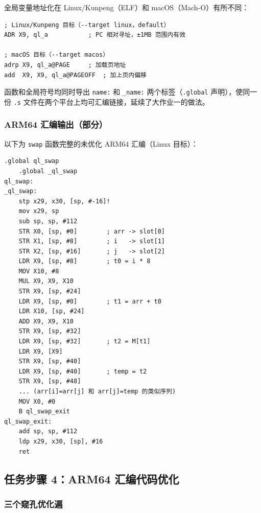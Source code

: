 \documentclass[12pt,a4paper]{ctexart}
\begin{document}
全局变量地址化在 Linux/Kunpeng（ELF）和 macOS（Mach-O）有所不同：

\begin{lstlisting}[language=ARM, caption={全局地址化：Linux 使用 ADR，macOS 使用 ADRP}]
; Linux/Kunpeng 目标（--target linux，default）
ADR X9, ql_a           ; PC 相对寻址，±1MB 范围内有效

; macOS 目标（--target macos）
adrp X9, ql_a@PAGE     ; 加载页地址
add  X9, X9, ql_a@PAGEOFF  ; 加上页内偏移
\end{lstlisting}

函数和全局符号均同时导出 \texttt{name:} 和 \texttt{\_name:} 两个标签（\texttt{.global}
声明），使同一份 \texttt{.s} 文件在两个平台上均可汇编链接，延续了大作业一的做法。

\subsubsection{ARM64 汇编输出（部分）}

以下为 \texttt{swap} 函数完整的未优化 ARM64 汇编（Linux 目标）：

\begin{lstlisting}[language=ARM, caption={qsort.s：ql\_swap 函数（未优化，Linux 目标）}]
    .global ql_swap
    .global _ql_swap
ql_swap:
_ql_swap:
    stp x29, x30, [sp, #-16]!
    mov x29, sp
    sub sp, sp, #112
    STR X0, [sp, #0]        ; arr -> slot[0]
    STR X1, [sp, #8]        ; i   -> slot[1]
    STR X2, [sp, #16]       ; j   -> slot[2]
    LDR X9, [sp, #8]        ; t0 = i * 8
    MOV X10, #8
    MUL X9, X9, X10
    STR X9, [sp, #24]
    LDR X9, [sp, #0]        ; t1 = arr + t0
    LDR X10, [sp, #24]
    ADD X9, X9, X10
    STR X9, [sp, #32]
    LDR X9, [sp, #32]       ; t2 = M[t1]
    LDR X9, [X9]
    STR X9, [sp, #40]
    LDR X9, [sp, #40]       ; temp = t2
    STR X9, [sp, #48]
    ... (arr[i]=arr[j] 和 arr[j]=temp 的类似序列)
    MOV X0, #0
    B ql_swap_exit
ql_swap_exit:
    add sp, sp, #112
    ldp x29, x30, [sp], #16
    ret
\end{lstlisting}

\subsection{任务步骤 4：ARM64 汇编代码优化}

\subsubsection{三个窥孔优化遍}
\end{document}
